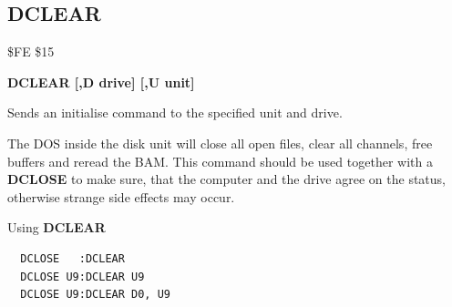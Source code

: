 
\newpage
\subsection{DCLEAR}
\begin{description}[leftmargin=2cm,style=nextline]
\item [Token:] \$FE \$15
\item [Format:] {\bf DCLEAR [,D drive] [,U unit] }
\item [Usage:]
   Sends an initialise command to
   the specified unit and drive.

   \drivedefinition

   \unitdefinition

\item [Remarks:]
   The DOS inside the disk unit will close all open files,
   clear all channels, free buffers and reread the BAM.
   This command should be used together with a {\bf DCLOSE}
   to make sure, that the computer and the drive agree
   on the status, otherwise strange side effects may occur.

\item [Example:] Using {\bf DCLEAR}
\begin{tcolorbox}[colback=black,coltext=white]
\verbatimfont{\codefont}
\begin{verbatim}
  DCLOSE   :DCLEAR
  DCLOSE U9:DCLEAR U9
  DCLOSE U9:DCLEAR D0, U9
\end{verbatim}
\end{tcolorbox}
\end{description}


\newpage
